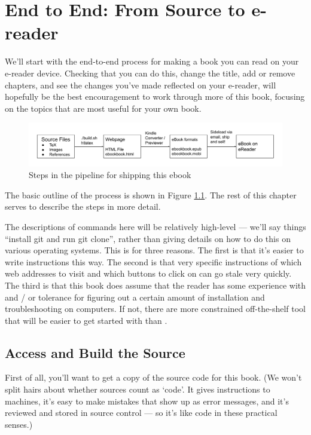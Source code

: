 
\chapter{End to End: From Source to e-reader}

We'll start with the end-to-end process for making a book you can read
on your e-reader device. Checking that you can do this, change the title,
add or remove chapters, and see the changes you've made reflected on your 
e-reader, will hopefully be the best encouragement to work through more
of this book, focusing on the topics that are most useful for your own book.

\begin{figure}
\includegraphics[width=\linewidth]{images/pipeline.png}
\caption{Steps in the pipeline for shipping this ebook}
\label{fig:pipeline}
\end{figure}

The basic outline of the process is shown in Figure \ref{fig:pipeline}.
The rest of this chapter serves to describe the steps in more detail.

The descriptions of commands here will be relatively high-level ---
we'll say things ``install git and run git clone'', rather than giving
details on how to do this on various operating systems. This is for
three reasons. The first is that it's easier to write instructions
this way. The second is that very specific instructions of which web
addresses to visit and which buttons to click on can go stale very
quickly. The third is that this book does assume that the reader has
some experience with and / or tolerance for figuring out a certain
amount of installation and troubleshooting on computers. If not, there are
more constrained off-the-shelf tool that will be easier to get started with
than \latex.

\section{Access and Build the \latex Source}

First of all, you'll want to get a copy of the source code for this
book. (We won't split hairs about whether \latex sources count as
`code'. It gives instructions to machines, it's easy to make mistakes
that show up as error messages, and it's reviewed and stored in source
control --- so it's like code in these practical senses.)

